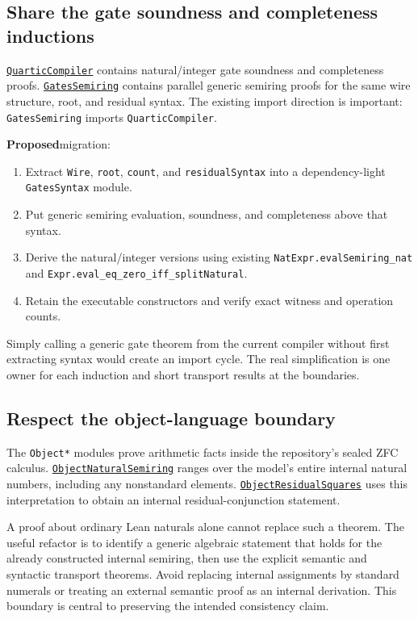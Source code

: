 \documentclass[11pt,letterpaper]{article}
\newcommand{\code}[1]{\nolinkurl{#1}}
\newcommand{\src}[1]{\href{https://github.com/VladimirReshetnikov/ProveIt/blob/60e9c5d620c6c387d932876cfa2d9376f64ea56c/Computability/DiophantineConsistency/Lean/DiophantineConsistency/#1.lean}{\texttt{#1}}}
\newcommand{\proposed}{\textbf{Proposed}}
\begin{document}
\subsection{Share the gate soundness and completeness inductions}

\src{QuarticCompiler} contains natural/integer gate soundness and completeness
proofs. \src{GatesSemiring} contains parallel generic semiring proofs for the
same wire structure, root, and residual syntax. The existing import direction
is important: \code{GatesSemiring} imports \code{QuarticCompiler}.

\proposed migration:
\begin{enumerate}
\item Extract \code{Wire}, \code{root}, \code{count}, and \code{residualSyntax}
  into a dependency-light \code{GatesSyntax} module.
\item Put generic semiring evaluation, soundness, and completeness above that syntax.
\item Derive the natural/integer versions using existing
  \code{NatExpr.evalSemiring_nat} and
  \code{Expr.eval_eq_zero_iff_splitNatural}.
\item Retain the executable constructors and verify exact witness and operation counts.
\end{enumerate}
Simply calling a generic gate theorem from the current compiler without first
extracting syntax would create an import cycle. The real simplification is one
owner for each induction and short transport results at the boundaries.

\subsection{Respect the object-language boundary}

The \code{Object*} modules prove arithmetic facts inside the repository's
sealed ZFC calculus. \src{ObjectNaturalSemiring} ranges over the model's entire
internal natural numbers, including any nonstandard elements.
\src{ObjectResidualSquares} uses this interpretation to obtain an internal
residual-conjunction statement.

A proof about ordinary Lean naturals alone cannot replace such a theorem.
The useful refactor is to identify a generic algebraic statement that holds
for the already constructed internal semiring, then use the explicit semantic
and syntactic transport theorems. Avoid replacing internal assignments by
standard numerals or treating an external semantic proof as an internal
derivation. This boundary is central to preserving the intended consistency claim.
\end{document}
